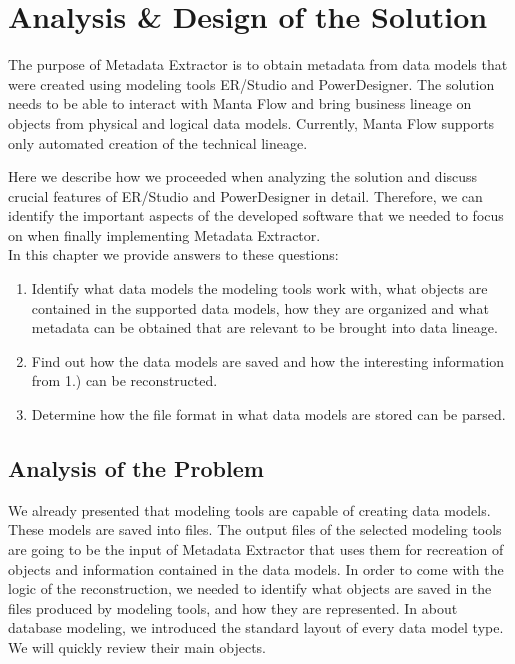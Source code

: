 \chapter{Analysis \& Design of the Solution}
\label{analysis_design}

The purpose of Metadata Extractor is to obtain metadata from data models that were created using modeling tools ER/Studio and PowerDesigner. 
The solution needs to be able to interact with Manta Flow and bring business lineage on objects from physical and logical data models. 
Currently, Manta Flow supports only automated creation of the technical lineage.

Here we describe how we proceeded when analyzing the solution and discuss crucial features of ER/Studio and PowerDesigner in detail.
Therefore, we can identify the important aspects of the developed software that we needed to focus on when finally implementing Metadata Extractor.\\

In this chapter we provide answers to these questions:
\begin{enumerate}
	\item Identify what data models the modeling tools work with, what objects are contained in the supported data models, how they are organized and what metadata can be obtained that are relevant to be brought into data lineage.
	\item Find out how the data models are saved and how the interesting information from 1.) can be reconstructed.
	\item Determine how the file format in what data models are stored can be parsed.
\end{enumerate}

\section{Analysis of the Problem}

We already presented that modeling tools are capable of creating data models. These models are saved into files. 
The output files of the selected modeling tools are going to be the input of Metadata Extractor that uses them for recreation of objects and information contained in the data models.
In order to come with the logic of the reconstruction, we needed to identify what objects are saved in the files produced by modeling tools, and how they are represented. 
In  about database modeling, we introduced the standard layout of every data model type. We will quickly review their main objects. \\

